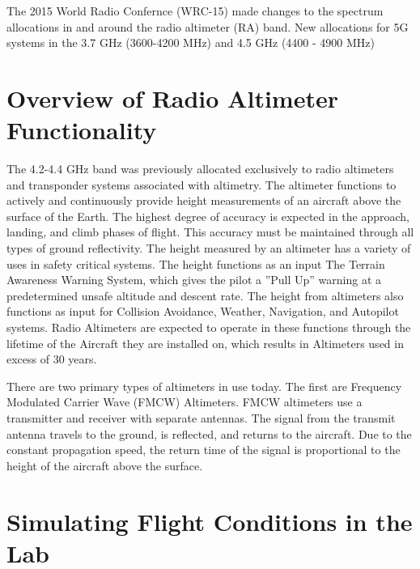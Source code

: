 The 2015 World Radio Confernce (WRC-15) made changes to the spectrum allocations in and around the radio altimeter (RA) band. New allocations for 5G systems in the 3.7 GHz (3600-4200 MHz) and 4.5 GHz (4400 - 4900 MHz)

\section{Overview of Radio Altimeter Functionality}
The 4.2-4.4 GHz band was previously allocated exclusively to radio altimeters and transponder systems associated with altimetry. The altimeter functions to actively and continuously provide height measurements of an aircraft above the surface of the Earth. The highest degree of accuracy is expected in the approach, landing, and climb phases of flight. This accuracy must be maintained through all types of ground reflectivity. The height measured by an altimeter has a variety of uses in safety critical systems. The height functions as an input The Terrain Awareness Warning System, which gives the pilot a  ''Pull Up'' warning at a predetermined unsafe altitude and descent rate. The height from altimeters also functions as input for Collision Avoidance, Weather, Navigation, and Autopilot systems. Radio Altimeters are expected to operate in these functions through the lifetime of the Aircraft they are installed on, which results in Altimeters used in excess of 30 years.

There are two primary types of altimeters in use today. The first are Frequency Modulated Carrier Wave (FMCW) Altimeters. FMCW altimeters use a transmitter and receiver with separate antennas. The signal from the transmit antenna travels to the ground, is reflected, and returns to the aircraft. Due to the constant propagation speed, the return time of the signal is proportional to the height of the aircraft above the surface. 


\section{Simulating Flight Conditions in the Lab}


